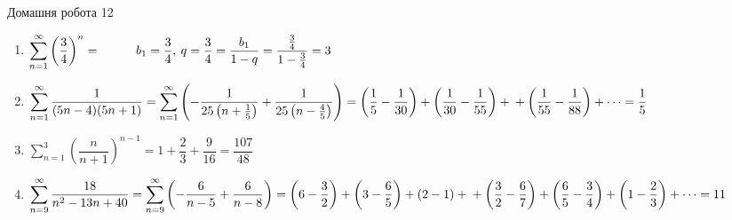 \documentclass[a4paper,12pt]{article}
\newcommand\tab[1][1cm]{\hspace*{#1}}
\begin{document}
\begin{center}
{\LARGE Домашня робота 12}	
\end{center}
\begin{enumerate}
	\item $\displaystyle\sum\limits_{n=1}^{\infty}\left(\dfrac34\right)^n=\\\tab b_1=\dfrac34,\>q=\dfrac34\\=\dfrac{b_1}{1-q}=\dfrac{\frac34}{1-\frac34}=3$
	\item $\displaystyle\sum\limits_{n=1}^{\infty}\dfrac1{(5n-4)(5n+1)}=\displaystyle\sum\limits_{n=1}^{\infty}\left(-\dfrac1{25\left(n+\frac15\right)}+\dfrac1{25\left(n-\frac45\right)}\right)=\left(\dfrac15-\dfrac1{30}\right)+\left(\dfrac1{30}-\dfrac1{55}\right)+\\+\left(\dfrac1{55}-\dfrac1{88}\right)+\dots=\dfrac15$
	\item $\displaystyle\sum\limits_{n=1}^{3}\left(\dfrac n{n+1} \right)^{n-1}=1+\dfrac23+\dfrac9{16}=\dfrac{107}{48}$
	\item $\displaystyle\sum\limits_{n=9}^{\infty}\dfrac{18}{n^2-13n+40}=\displaystyle\sum\limits_{n=9}^{\infty}\left(-\dfrac6{n-5}+\dfrac6{n-8}\right)=\left(6-\dfrac32\right)+\left(3-\dfrac65\right)+(2-1)+\\+\left(\dfrac32-\dfrac67\right)+\left(\dfrac65-\dfrac34\right)+\left(1-\dfrac23\right)+\dots=11$
\end{enumerate}
\end{document}
